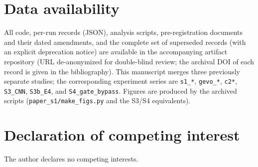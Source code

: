 \documentclass[10pt]{article}
\begin{document}

\section*{Data availability}
All code, per-run records (JSON), analysis scripts, pre-registration documents
and their dated amendments, and the complete set of superseded records (with
an explicit deprecation notice) are available in the accompanying artifact
repository (URL de-anonymized for double-blind review; the archival DOI
of each record is given in the bibliography). This manuscript merges
three previously separate studies; the corresponding experiment series are
\texttt{s1\_*}, \texttt{gevo\_*}, \texttt{c2*}, \texttt{S3\_CNN},
\texttt{S3b\_E4}, and \texttt{S4\_gate\_bypass}. Figures are produced by the
archived scripts (\texttt{paper\_s1/make\_figs.py} and the S3/S4 equivalents).

\section*{Declaration of competing interest}
The author declares no competing interests.



\end{document}
